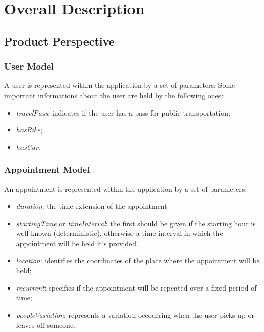 \chapter{Overall Description}

\section{Product Perspective}

\subsection{User Model}
A user is represented within the application by a set of parameters:
Some important informations about the user are held by the following ones:
\begin{itemize}
\item \textit{travelPass}: indicates if the user has a pass for public transportation;
\item \textit{hasBike};
\item \textit{hasCar}.
\end{itemize}

\subsection{Appointment Model}
An appointment is represented within the application by a set of parameters:
\begin{itemize}
\item \textit{duration}: the time extension of the appointment
\item \textit{startingTime} or \textit{timeInterval}: the first should be given if the starting hour is well-known (deterministic), otherwise a time interval in which the appointment will be held it's provided. 
\item \textit{location}: identifies the coordinates of the place where the appointment will be held;
\item \textit{recurrent}: specifies if the appointment will be repeated over a fixed period of time;
\item \textit{peopleVariation}: represents a variation occourring when the user picks up or leaves off someone.
\end{itemize}

